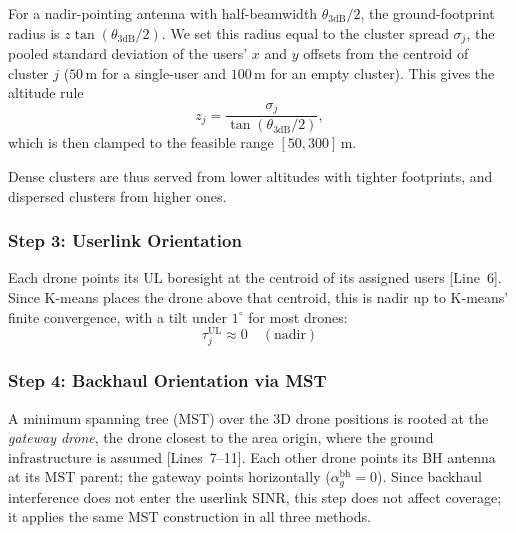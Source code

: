 \documentclass[conference]{IEEEtran}
\newcommand{\dB}{\,\mathrm{dB}}
\begin{document}
For a nadir-pointing antenna with half-beamwidth $\theta_{3\mathrm{dB}}/2$, the ground-footprint radius is $z \tan(\theta_{3\mathrm{dB}}/2).$
We set this radius equal to the cluster spread $\sigma_j$, the pooled standard deviation of the users' $x$ and $y$ offsets from the centroid of cluster $j$ ($50$\,m for a single-user and $100$\,m for an empty cluster). This gives the altitude rule
\begin{equation}
\label{eq:altitude}
z_j = \frac{\sigma_j}{\tan(\theta_{3\mathrm{dB}}/2)},
\end{equation}
which is then clamped to the feasible range $[50, 300]$\,m.

Dense clusters are thus served from lower altitudes with tighter footprints, and dispersed clusters from higher ones.

\subsubsection{Step 3: Userlink Orientation}
Each drone points its UL boresight at the centroid of its assigned users [Line~6]. Since K-means places the drone above that centroid, this is nadir up to K-means' finite convergence, with a tilt under $1^\circ$ for most drones:
\begin{equation}
\tau_j^{\mathrm{UL}} \approx 0 \quad (\text{nadir})
\end{equation}

\subsubsection{Step 4: Backhaul Orientation via MST}
A minimum spanning tree (MST) over the 3D drone positions is rooted at the \emph{gateway drone}, the drone closest to the area origin, where the ground infrastructure is assumed [Lines~7--11]. Each other drone points its BH antenna at its MST parent; the gateway points horizontally ($\alpha_g^{\mathrm{bh}} = 0$). Since backhaul interference does not enter the userlink SINR, this step does not affect coverage; it applies the same MST construction in all three methods.
\end{document}
